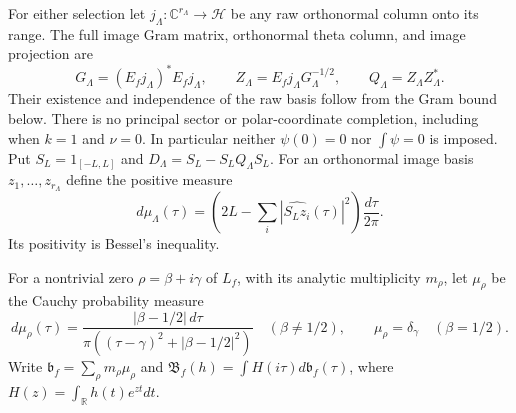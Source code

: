 For either selection let $j_\Lambda:\mathbb C^{r_\Lambda}\to\mathcal H$
be any raw orthonormal column onto its range.  The full image Gram
matrix, orthonormal theta column, and image projection are
\begin{equation}\label{hnew:gram-definition}
 G_\Lambda=(E_fj_\Lambda)^*E_fj_\Lambda,\qquad
 Z_\Lambda=E_fj_\Lambda G_\Lambda^{-1/2},\qquad
 Q_\Lambda=Z_\Lambda Z_\Lambda^*.
\end{equation}
Their existence and independence of the raw basis follow from the
Gram bound below.  There is no principal sector or polar-coordinate
completion, including when $k=1$ and $\nu=0$.
In particular neither $\psi(0)=0$ nor $\int\psi=0$ is imposed.
Put $S_L=1_{[-L,L]}$ and
$D_\Lambda=S_L-S_LQ_\Lambda S_L$.  For an orthonormal image basis
$z_1,\ldots,z_{r_\Lambda}$ define the positive measure
\begin{equation}\label{hnew:measure}
 d\mu_\Lambda(\tau)=
 \left(2L-\sum_i|\widehat{S_Lz_i}(\tau)|^2\right)\frac{d\tau}{2\pi}.
\end{equation}
Its positivity is Bessel's inequality.

For a nontrivial zero $\rho=\beta+i\gamma$ of $L_f$, with its
analytic multiplicity $m_\rho$, let $\mu_\rho$ be the Cauchy
probability measure
\[
 d\mu_\rho(\tau)=
 \frac{|\beta-1/2|\,d\tau}
 {\pi((\tau-\gamma)^2+|\beta-1/2|^2)}
 \quad(\beta\ne1/2),\qquad
 \mu_\rho=\delta_\gamma\quad(\beta=1/2).
\]
Write $\mathfrak b_f=\sum_\rho m_\rho\mu_\rho$ and
$\mathfrak B_f(h)=\int H(i\tau)d\mathfrak b_f(\tau)$, where
$H(z)=\int_{\mathbb R}h(t)e^{zt}dt$.

